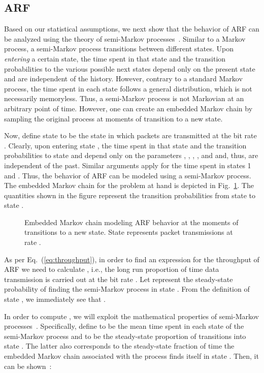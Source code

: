 \documentclass[11pt, journal, letterpaper, oneside, onecolumn]{IEEEtran}
\newcommand{\linegap}{1}
\begin{document}
\subsection{ARF}
\label{sec:ARF}

Based on our statistical assumptions, we next show that the behavior
of ARF can be analyzed using the theory of semi-Markov
processes~\cite{ROSS}. Similar to a Markov process, a semi-Markov
process transitions between different states. Upon \emph{entering} a
certain state, the time spent in that state and the transition
probabilities to the various possible next states depend only on the
present state and are independent of the history. However, contrary
to a standard Markov process, the time spent in each state follows a
general distribution, which is not necessarily memoryless. Thus, a
semi-Markov process is not Markovian at an arbitrary point of time.
However, one can create an embedded Markov chain by sampling the
original process at moments of transition to a new state.

Now, define state  to be the state in which packets are
transmitted at the bit rate . Clearly, upon entering state , the time spent in that state and the transition
probabilities to state  and  depend only on the
parameters , , , ,  and 
and, thus, are independent of the past.
Similar arguments apply for the time spent in states 1 and .
Thus, the  behavior of ARF can be modeled using a semi-Markov
process. The embedded Markov chain for the problem at hand is
depicted in Fig.~\ref{fig:ARF-Macro}. The quantities 
shown in the figure represent the transition probabilities from
state  to state .

\begin{figure}[t]
\centering
{}
\caption{Embedded Markov chain modeling  ARF behavior at the
moments of transitions to a new state. State  represents packet
transmissions at rate .} \label{contblock}
\label{fig:ARF-Macro}
\end{figure}\renewcommand{\baselinestretch}{\linegap}



As per Eq.~(\ref{eq:throughput}), in order to find an expression
for the throughput of ARF we need to calculate , i.e., the
long run proportion of time data transmission is carried out at
the bit rate . Let  represent the steady-state
probability of finding the semi-Markov process in state . From
the definition of state , we immediately see that
.

In order to compute , we will exploit the mathematical
properties of semi-Markov processes~\cite{ROSS}. Specifically,
define  to be the mean time spent in each state  of the
semi-Markov process and  to be the steady-state proportion
of transitions into state . The latter also corresponds to the
steady-state fraction of time the embedded Markov chain associated
with the process finds itself in state . Then, it can be
shown~\cite{ROSS}:
\end{document}
